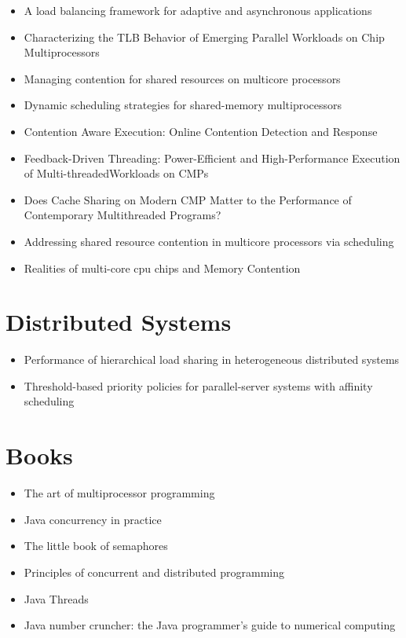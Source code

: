 \begin{itemize}
\item A load balancing framework for adaptive and asynchronous
  applications \cite{Barker2004}
\item Characterizing the TLB Behavior of Emerging Parallel Workloads
  on Chip Multiprocessors \cite{Bhattacharjee2009}
\item Managing contention for shared resources on multicore processors
  \cite{Fedorova2010}
\item Dynamic scheduling strategies for shared-memory multiprocessors
  \cite{Hamidzadeh1996}
\item Contention Aware Execution: Online Contention Detection and
  Response \cite{Soffa2010}
\item Feedback-Driven Threading: Power-Efficient and High-Performance
  Execution of Multi-threadedWorkloads on CMPs \cite{Suleman2008}
\item Does Cache Sharing on Modern CMP Matter to the Performance of
  Contemporary Multithreaded Programs? \cite{Zhang2010}
\item Addressing shared resource contention in multicore processors
  via scheduling \cite{Zhuravlev2010}
\item Realities of multi-core cpu chips and Memory Contention
  \cite{Barker2009}
\end{itemize}


\section*{Distributed Systems}
\label{sec:lr-distributed-systems}

\begin{itemize}
\item Performance of hierarchical load sharing in heterogeneous
  distributed systems \cite{Lo1996}
\item Threshold-based priority policies for parallel-server systems
  with affinity scheduling \cite{Squillante2001}
\end{itemize}


\section*{Books}
\label{sec:lr-books}

\begin{itemize}
\item The art of multiprocessor programming \cite{Herlihy2008}
\item Java concurrency in practice \cite{Goetz2006}
\item The little book of semaphores \cite{Downey2008}
\item Principles of concurrent and distributed programming
  \cite{Ben-Ari2006}
\item Java Threads \cite{Oaks2004}
\item Java number cruncher: the Java programmer's guide to numerical
  computing \cite{Mak2002}
\end{itemize}


